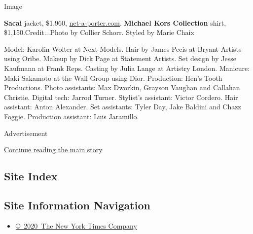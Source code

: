 Image

\textbf{Sacai} jacket, \$1,960,
\href{https://www.net-a-porter.com/us/en/}{net-a-porter.com}.
\textbf{Michael Kors Collection} shirt, \$1,150.Credit...Photo by
Collier Schorr. Styled by Marie Chaix

Model: Karolin Wolter at Next Models. Hair by James Pecis at Bryant
Artists using Oribe. Makeup by Dick Page at Statement Artists. Set
design by Jesse Kaufmann at Frank Reps. Casting by Julia Lange at
Artistry London. Manicure: Maki Sakamoto at the Wall Group using Dior.
Production: Hen's Tooth Productions. Photo assistants: Max Dworkin,
Grayson Vaughan and Callahan Christie. Digital tech: Jarrod Turner.
Stylist's assistant: Victor Cordero. Hair assistant: Anton Alexander.
Set assistants: Tyler Day, Jake Baldini and Chazz Foggie. Production
assistant: Luis Jaramillo.

Advertisement

\protect\hyperlink{after-bottom}{Continue reading the main story}

\hypertarget{site-index}{%
\subsection{Site Index}\label{site-index}}

\hypertarget{site-information-navigation}{%
\subsection{Site Information
Navigation}\label{site-information-navigation}}

\begin{itemize}
\tightlist
\item
  \href{https://help.nytimes3xbfgragh.onion/hc/en-us/articles/115014792127-Copyright-notice}{©~2020~The
  New York Times Company}
\end{itemize}

